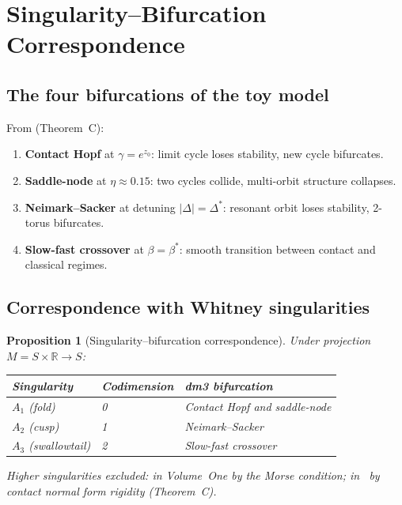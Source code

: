 \documentclass[12pt]{article}
\numberwithin{equation}{section}
\newtheorem{proposition}[theorem]{Proposition}
\theoremstyle{remark}
\newcommand{\R}{\mathbb{R}}
\begin{document}
\section{Singularity--Bifurcation Correspondence}
\label{sec:bifurcations}

\subsection{The four bifurcations of the toy model}

From \cite{Paper2} (Theorem~C):
\begin{enumerate}[label=(\roman*)]
  \item \textbf{Contact Hopf} at $\gamma=e^{z_0}$: limit cycle
        loses stability, new cycle bifurcates.
  \item \textbf{Saddle-node} at $\eta\approx 0.15$: two cycles
        collide, multi-orbit structure collapses.
  \item \textbf{Neimark--Sacker} at detuning $|\Delta|=\Delta^*$:
        resonant orbit loses stability, 2-torus bifurcates.
  \item \textbf{Slow-fast crossover} at $\beta=\beta^*$: smooth
        transition between contact and classical regimes.
\end{enumerate}

\subsection{Correspondence with Whitney singularities}

\begin{proposition}[Singularity--bifurcation correspondence]
\label{prop:sing-bif}
Under projection $M=S\times\R\to S$:
\begin{center}
\begin{tabular}{lll}
\toprule
Singularity & Codimension & dm3 bifurcation \\
\midrule
$A_1$ (fold) & 0 & Contact Hopf and saddle-node \\
$A_2$ (cusp) & 1 & Neimark--Sacker \\
$A_3$ (swallowtail) & 2 & Slow-fast crossover \\
\bottomrule
\end{tabular}
\end{center}
Higher singularities excluded: in Volume~One by the Morse
condition; in~\cite{Paper1} by contact normal form rigidity
(Theorem~C).
\end{proposition}
\end{document}
